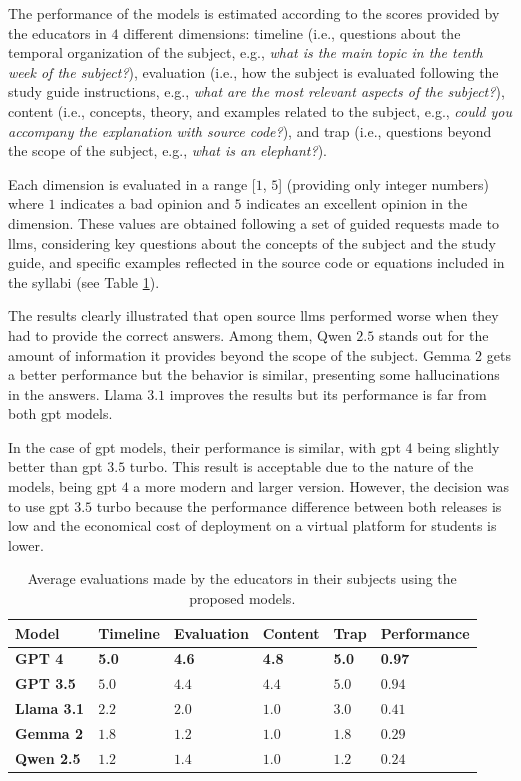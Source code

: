 \documentclass[pdflatex,sn-mathphys-num]{sn-jnl}%
\begin{document}
The performance of the models is estimated according to the scores provided by the educators in $4$ different dimensions: timeline (i.e., questions about the temporal organization of the subject, e.g., \emph{what is the main topic in the tenth week of the subject?}), evaluation (i.e., how the subject is evaluated following the study guide instructions, e.g., \emph{what are the most relevant aspects of the subject?}), content (i.e., concepts, theory, and examples related to the subject, e.g., \emph{could you accompany the explanation with source code?}), and trap (i.e., questions beyond the scope of the subject, e.g., \emph{what is an elephant?}).

Each dimension is evaluated in a range [$1$, $5$] (providing only integer numbers) where $1$ indicates a bad opinion and $5$ indicates an excellent opinion in the dimension. These values are obtained following a set of guided requests made to \acp{llm}, considering key questions about the concepts of the subject and the study guide, and specific examples reflected in the source code or equations included in the syllabi (see Table \ref{tab:evaluations}).

The results clearly illustrated that open source \acp{llm} performed worse when they had to provide the correct answers. Among them, Qwen $2.5$ stands out for the amount of information it provides beyond the scope of the subject. Gemma $2$ gets a better performance but the behavior is similar, presenting some hallucinations in the answers. Llama $3.1$ improves the results but its performance is far from both \ac{gpt} models.

In the case of \ac{gpt} models, their performance is similar, with \ac{gpt} $4$ being slightly better than \ac{gpt} $3.5$ turbo. This result is acceptable due to the nature of the models, being \ac{gpt} $4$ a more modern and larger version. However, the decision was to use \ac{gpt} $3.5$ turbo because the performance difference between both releases is low and the economical cost of deployment on a virtual platform for students is lower.

\begin{table}[t!]
	\centering
	\begin{tabular}{|l|l|l|l|l|l|}
		\hline
		\textbf{Model}     & \textbf{Timeline} & \textbf{Evaluation} & \textbf{Content} & \textbf{Trap} & \textbf{Performance}\\ \hline
		\textbf{GPT 4}     & \textbf{5.0} & \textbf{4.6} & \textbf{4.8} & \textbf{5.0} & \textbf{0.97} \\ \hline
		\textbf{GPT 3.5}   & $5.0$ & $4.4$ & $4.4$ & $5.0$ & $0.94$ \\ \hline
		\textbf{Llama 3.1} & $2.2$ & $2.0$ & $1.0$ & $3.0$ & $0.41$ \\ \hline
		\textbf{Gemma 2}   & $1.8$ & $1.2$ & $1.0$ & $1.8$ & $0.29$ \\ \hline
		\textbf{Qwen 2.5}  & $1.2$ & $1.4$ & $1.0$ & $1.2$ & $0.24$ \\ \hline
	\end{tabular}
	\caption{Average evaluations made by the educators in their subjects using the proposed models.}
	\label{tab:evaluations}
\end{table}
\end{document}
